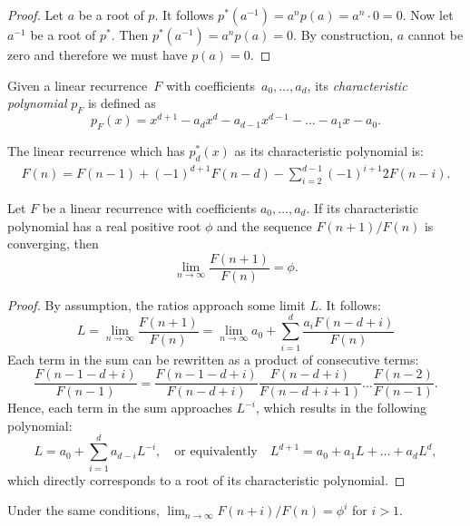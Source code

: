 \documentclass[english,version-2020-11]{uzl-thesis}
\begin{document}
\begin{proof}
  Let $a$ be a root of $p$. It follows $p^*(a^{-1}) = a^n p(a) = a^n \cdot 0 = 0$.
  Now let $a^{-1}$ be a root of $p^*$. Then $p^*(a^{-1}) = a^n p(a) = 0$.
  By construction, $a$ cannot be zero and therefore we must have $p(a) = 0$.
\end{proof}

\begin{definition}
  Given a linear recurrence~$F$ with coefficients~$a_0, \dots, a_d$, its
  \emph{characteristic polynomial} $p_F$ is defined as
  \[
    p_F(x) = x^{d+1} - a_d x^d - a_{d-1} x^{d-1} - \dots - a_1 x - a_0.
  \]
\end{definition}

\begin{example}
  The linear recurrence which has $p_d^*(x)$ as its characteristic polynomial is:
  \begin{align*}
    F(n) = F(n - 1) + (-1)^{d+1} F(n - d) - \sum_{i=2}^{d - 1} (-1)^{i+1} 2 F(n - i).
  \end{align*}
\end{example}

\begin{lemma}
  Let $F$ be a linear recurrence with coefficients $a_0, \dots, a_d$.
  If its characteristic polynomial has a real positive root $\phi$
  and the sequence $F(n+1)/F(n)$ is converging, then
  \[
    \lim_{n \to \infty} \frac{F(n + 1)}{F(n)} = \phi.
  \]
\end{lemma}

\begin{proof}
  By assumption, the ratios approach some limit $L$. It follows:
  \[
    L
    = \lim_{n \to \infty} \frac{F(n + 1)}{F(n)}
    = \lim_{n \to \infty} a_0 + \sum_{i = 1}^d \frac{a_i F(n - d + i)}{F(n)}
  \]
  Each term in the sum can be rewritten as a product of consecutive terms:
  \[
    \frac{F(n - 1 - d + i)}{F(n - 1)}
    = \frac{F(n - 1 - d + i)}{F(n - d + i)} \frac{F(n - d + i)}{F(n - d + i + 1)} \dots \frac{F(n - 2)}{F(n-1)}.
  \]
  Hence, each term in the sum approaches $L^{-i}$,
  which results in the following polynomial:
  \[
    L = a_0 + \sum_{i = 1}^d a_{d - i} L^{-i},
    \quad \text{or equivalently} \quad
    L^{d+1} = a_0 + a_1 L + \dots + a_d L^d,
  \]
  which directly corresponds to a root of its characteristic polynomial.
\end{proof}

\begin{corollary}
  Under the same conditions, $\lim_{n \to \infty} F(n + i) / F(n) = \phi^i$ for $i > 1$.
\end{corollary}
\end{document}
